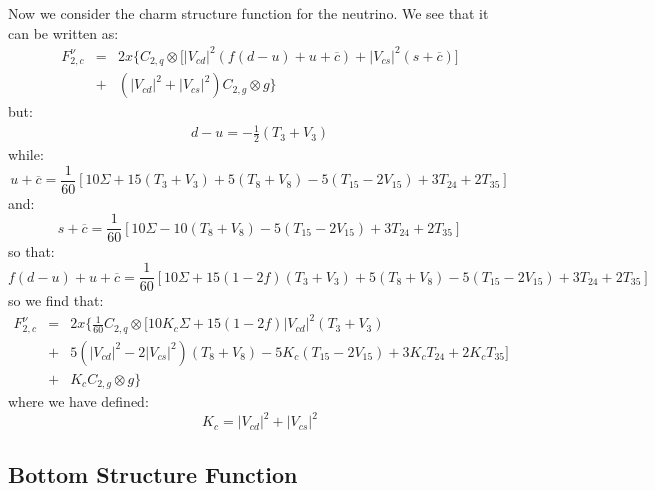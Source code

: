 \documentclass[10pt,a4paper]{article}
\begin{document}
Now we consider the charm structure function for the neutrino. We see that it can be written as:
\begin{equation}
\begin{array}{rcl}
F_{2,c}^{\nu} &=& 2x\Big\{C_{2,q}\otimes\Big[|V_{cd}|^2(f(d-u)+u+\overline{c}) + |V_{cs}|^2 (s+\overline{c})\Big]\\
              &+& \left(|V_{cd}|^2+|V_{cs}|^2\right)C_{2,g}\otimes g\Big\}
\end{array}
\end{equation}
but:
\begin{equation}
\begin{array}{l}
\displaystyle d - u = -\frac12(T_3+V_3)
\end{array}
\end{equation}
while:
\begin{equation}
u+\overline{c} = \frac1{60}[10\Sigma+15(T_3+V_3)+5(T_8+V_8)-5(T_{15}-2V_{15})+3T_{24}+2T_{35}]
\end{equation}
and:
\begin{equation}
s+\overline{c} = \frac1{60}[10\Sigma-10(T_8+V_8)-5(T_{15}-2V_{15})+3T_{24}+2T_{35}]
\end{equation}
so that:
\begin{equation}
f(d - u)+u+\overline{c} = \frac1{60}[10\Sigma+15(1-2f)(T_3+V_3)+5(T_8+V_8)-5(T_{15}-2V_{15})+3T_{24}+2T_{35}]
\end{equation}
so we find that:
\begin{equation}
\begin{array}{rcl}  
F_{2,c}^{\nu} &=& \displaystyle 2x\Bigg\{\frac1{60}C_{2,q}\otimes\Bigg[10K_c\Sigma+15(1-2f)|V_{cd}|^2(T_3 + V_3)\\
              &+& \displaystyle  5(|V_{cd}|^2-2|V_{cs}|^2)(T_8+V_8) - 5K_c(T_{15}-2V_{15})+3K_cT_{24}+2K_cT_{35}\Bigg]\\
              &+& K_cC_{2,g}\otimes g\Bigg\}
\end{array}
\end{equation}
where we have defined:
\begin{equation}
K_c = |V_{cd}|^2+|V_{cs}|^2
\end{equation}

\subsection{Bottom Structure Function}
\end{document}
